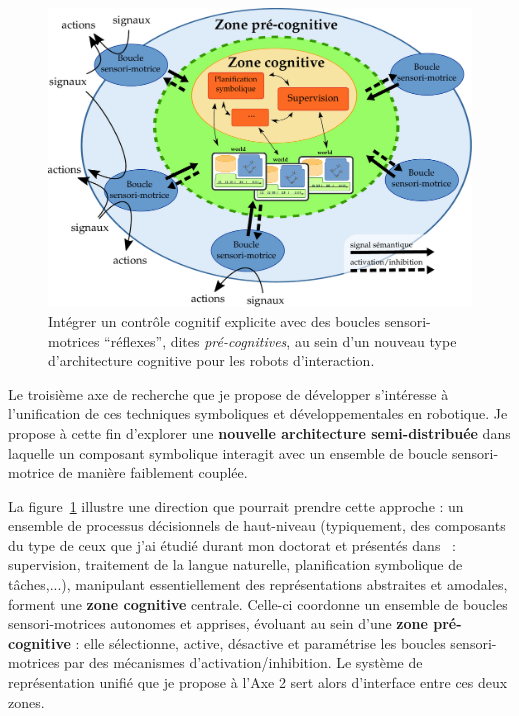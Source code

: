 \documentclass[a4paper]{article}
\begin{document}
\begin{figure}
    \centering
    \includegraphics[width=1.0\linewidth]{archi}
    \caption{\small Intégrer un contrôle cognitif explicite avec des boucles
        sensori-motrices ``réflexes'', dites \emph{pré-cognitives}, au sein
    d'un nouveau type d'architecture cognitive pour les robots d'interaction.}
    \label{archi}
\end{figure}

Le troisième axe de recherche que je propose de développer s'intéresse à
l'unification de ces techniques symboliques et développementales en robotique.
Je propose à cette fin d'explorer une \textbf{nouvelle architecture
semi-distribuée} dans laquelle un composant symbolique
interagit avec un ensemble de boucle sensori-motrice de manière faiblement
couplée.

La figure~\ref{archi} illustre une direction que pourrait prendre cette approche
: un ensemble de processus décisionnels de haut-niveau (typiquement, des
composants du type de ceux que j'ai étudié durant mon doctorat et présentés
dans~\cite{lemaignan2015human} : supervision, traitement de la langue naturelle,
planification symbolique de tâches,...), manipulant essentiellement des
représentations abstraites et amodales, forment une \textbf{zone cognitive}
centrale. Celle-ci coordonne un ensemble de boucles sensori-motrices autonomes
et apprises, évoluant au sein d'une \textbf{zone pré-cognitive} : elle
sélectionne, active, désactive et paramétrise les boucles sensori-motrices par
des mécanismes d'activation/inhibition. Le système de représentation unifié que
je propose à l'Axe 2 sert alors d'interface entre ces deux zones.
\end{document}
